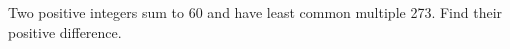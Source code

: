 Two positive integers sum to 60 and have least common multiple 273. Find their positive difference.
